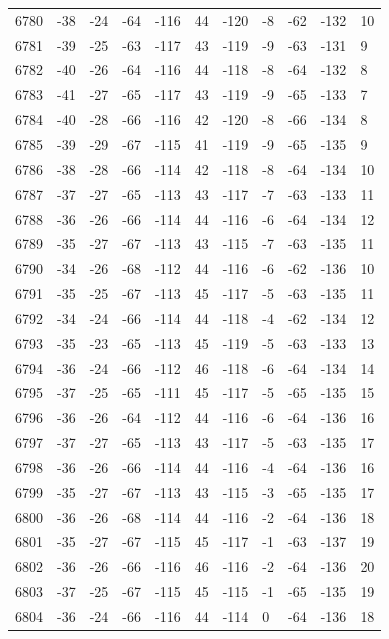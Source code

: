 \begin{table}[H]
\begin{tabular}{lllllllllll}
6780 & -38 & -24 & -64 & -116 & 44 & -120 & -8 & -62 & -132 & 10 \\
6781 & -39 & -25 & -63 & -117 & 43 & -119 & -9 & -63 & -131 & 9 \\
6782 & -40 & -26 & -64 & -116 & 44 & -118 & -8 & -64 & -132 & 8 \\
6783 & -41 & -27 & -65 & -117 & 43 & -119 & -9 & -65 & -133 & 7 \\
6784 & -40 & -28 & -66 & -116 & 42 & -120 & -8 & -66 & -134 & 8 \\
6785 & -39 & -29 & -67 & -115 & 41 & -119 & -9 & -65 & -135 & 9 \\
6786 & -38 & -28 & -66 & -114 & 42 & -118 & -8 & -64 & -134 & 10 \\
6787 & -37 & -27 & -65 & -113 & 43 & -117 & -7 & -63 & -133 & 11 \\
6788 & -36 & -26 & -66 & -114 & 44 & -116 & -6 & -64 & -134 & 12 \\
6789 & -35 & -27 & -67 & -113 & 43 & -115 & -7 & -63 & -135 & 11 \\
6790 & -34 & -26 & -68 & -112 & 44 & -116 & -6 & -62 & -136 & 10 \\
6791 & -35 & -25 & -67 & -113 & 45 & -117 & -5 & -63 & -135 & 11 \\
6792 & -34 & -24 & -66 & -114 & 44 & -118 & -4 & -62 & -134 & 12 \\
6793 & -35 & -23 & -65 & -113 & 45 & -119 & -5 & -63 & -133 & 13 \\
6794 & -36 & -24 & -66 & -112 & 46 & -118 & -6 & -64 & -134 & 14 \\
6795 & -37 & -25 & -65 & -111 & 45 & -117 & -5 & -65 & -135 & 15 \\
6796 & -36 & -26 & -64 & -112 & 44 & -116 & -6 & -64 & -136 & 16 \\
6797 & -37 & -27 & -65 & -113 & 43 & -117 & -5 & -63 & -135 & 17 \\
6798 & -36 & -26 & -66 & -114 & 44 & -116 & -4 & -64 & -136 & 16 \\
6799 & -35 & -27 & -67 & -113 & 43 & -115 & -3 & -65 & -135 & 17 \\
6800 & -36 & -26 & -68 & -114 & 44 & -116 & -2 & -64 & -136 & 18 \\
6801 & -35 & -27 & -67 & -115 & 45 & -117 & -1 & -63 & -137 & 19 \\
6802 & -36 & -26 & -66 & -116 & 46 & -116 & -2 & -64 & -136 & 20 \\
6803 & -37 & -25 & -67 & -115 & 45 & -115 & -1 & -65 & -135 & 19 \\
6804 & -36 & -24 & -66 & -116 & 44 & -114 & 0 & -64 & -136 & 18 \\

\end{tabular}
\end{table}
